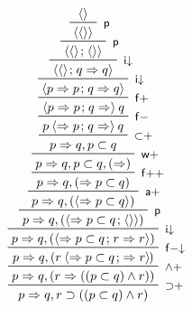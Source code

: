 $$
\R[\rsf{{\limp}{+}}]
{\R[\rsf{{\land}{+}}]
{\R[\rsf{f{-}{\da}}]
{\R[\rsf{i{\da}}]
{\R[\rsf{p}]
{\R[\rsf{a{+}}]
{\R[\rsf{f{+}{+}}]
{\R[\rsf{w{+}}]
{\R[\rsf{{\lsub}{+}}]
{\R[\rsf{f{-}}]
{\R[\rsf{f{+}}]
{\R[\rsf{i{\da}}]
{\R[\rsf{i{\da}}]
{\R[\rsf{p}]
{\R[\rsf{p}]
{\piq{}}
{\piq{\piq{}}}}
{\piq{\piq{} \sep \piq{}}}}
{\piq{\piq{} \sep q \seq q}}}
{\piq{p \seq p \sep q \seq q}}}
{{\!} \piq{p \seq p \sep q \seq} q}}
{p \piq{\seq p \sep q \seq} q}}
{p \seq q, p \lsub q}}
{p \seq q, p \lsub q, (\seq)}}
{p \seq q, (\seq p \lsub q)}}
{p \seq q, (\piq{\seq p \lsub q})}}
{p \seq q, (\piq{\seq p \lsub q \sep \piq{}})}}
{p \seq q, (\piq{\seq p \lsub q \sep r \seq r})}}
{p \seq q, (r \piq{\seq p \lsub q \sep \seq r} {\!\!})}}
{p \seq q, (r \seq ((p \lsub q) \land r))}}
{p \seq q, r \limp ((p \lsub q) \land r)}
$$